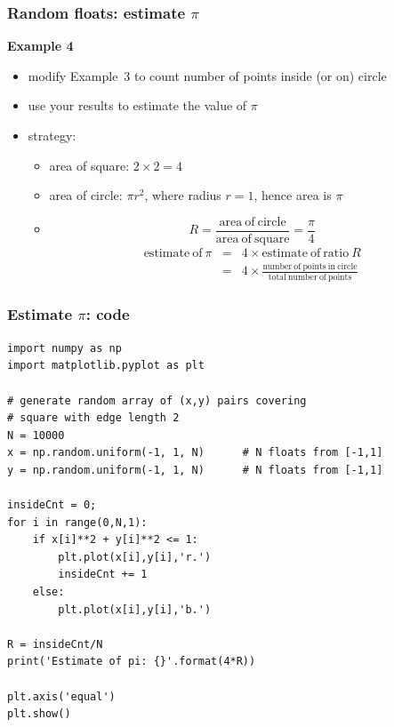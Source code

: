 \documentclass[english,14pt]{beamer}
\begin{document}

\begin{frame}[fragile]

\frametitle{Random floats: estimate $\pi$}

\textbf{Example 4}\\
\begin{itemize}
	\item modify Example~3 to count number of points inside (or on) circle
	\item use your results to estimate the value of $\pi$
	\pause
	\item strategy:
	\begin{itemize}
		\item area of square: $2 \times 2 = 4$
		\item area of circle: $\pi r^2$, where radius $r=1$, hence area is $\pi$
		\item[]
		\[
			R = \frac{\mathrm{area~of~circle}}{\mathrm{area~of~square}} = \frac{\pi}{4}
		\]
		\pause		
		\begin{eqnarray*}
			\mathrm{estimate~of~} \pi & = & 4\times \mathrm{estimate~of~ratio~} R \\
			& =& 4 \times \frac{\mathrm{number~of~points~in~circle}}{\mathrm{total~number~of~points}}
		\end{eqnarray*}
	\end{itemize}
\end{itemize}

\end{frame}


\begin{frame}[fragile]

\frametitle{Estimate $\pi$: code}
\vspace*{-3mm}
\begin{lstlisting}[style=CStyle,basicstyle=\scriptsize]
import numpy as np
import matplotlib.pyplot as plt

# generate random array of (x,y) pairs covering
# square with edge length 2
N = 10000
x = np.random.uniform(-1, 1, N)      # N floats from [-1,1]
y = np.random.uniform(-1, 1, N)      # N floats from [-1,1]

insideCnt = 0;
for i in range(0,N,1):
    if x[i]**2 + y[i]**2 <= 1:
        plt.plot(x[i],y[i],'r.')
        insideCnt += 1
    else:
        plt.plot(x[i],y[i],'b.')

R = insideCnt/N
print('Estimate of pi: {}'.format(4*R))

plt.axis('equal')
plt.show()
\end{lstlisting}

\end{frame}
\end{document}
